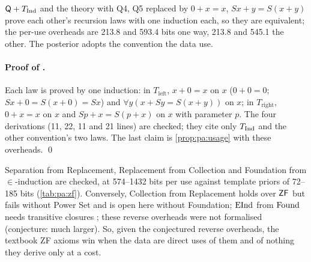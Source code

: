 \begin{proposition}\pabrk{}\label{prop:pa:recursion}
$\mathsf{Q}+T_{\mathrm{Ind}}$ and the theory with Q4, Q5 replaced by $0+x=x$, $Sx+y=S(x+y)$ prove each other's recursion laws with one induction each, so they are equivalent; the per-use overheads are 213.8 and 593.4 bits one way, 213.8 and 545.1 the other. The posterior adopts the convention the data use.
\end{proposition}

\paragraph{Proof of .} Each law is proved by one induction: in $T_{\mathrm{left}}$, $x+0=x$ on $x$ ($0+0=0$; $Sx+0=S(x+0)=Sx$) and $\forall y(x+Sy=S(x+y))$ on $x$; in $T_{\mathrm{right}}$, $0+x=x$ on $x$ and $Sp+x=S(p+x)$ on $x$ with parameter $p$. The four derivations (11, 22, 11 and 21 lines) are checked; they cite only $T_{\mathrm{Ind}}$ and the other convention's two laws. The last claim is \cref{prop:pa:usage} with these overheads. \qed

\begin{remark}[ZF]\pabrk{}\label{rem:pa:zf}
Separation from Replacement, Replacement from Collection and Foundation from $\in$-induction are checked, at 574--1432 bits per use against template priors of 72--185 bits (\cref{tab:pa:zf}). Conversely, Collection from Replacement holds over $\mathsf{ZF}$ but fails without Power Set \citep{zarach1996replacement,gitman2016zfc} and is open here without Foundation; $\mathrm{EInd}$ from $\mathrm{Found}$ needs transitive closures \citep{kaye2007interpretations}; these reverse overheads were not formalised (conjecture: much larger). So, given the conjectured reverse overheads, the textbook ZF axioms win when the data are direct uses of them and of nothing they derive only at a cost.
\end{remark}

